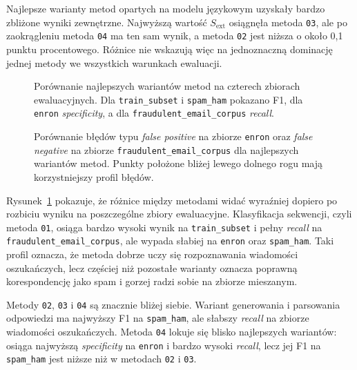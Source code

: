\begin{table}[htbp]
\centering
\small
\resizebox{\textwidth}{!}{}
\caption{Najlepsze punkty kontrolne uzyskane dla porównywanych metod.}
\label{tab:method-comparison-best}
\end{table}

Najlepsze warianty metod opartych na modelu językowym uzyskały bardzo zbliżone
wyniki zewnętrzne. Najwyższą wartość \(S_{\mathrm{ext}}\) osiągnęła metoda
\texttt{03}, ale po zaokrągleniu metoda \texttt{04} ma ten sam wynik, a metoda
\texttt{02} jest niższa o około 0,1 punktu procentowego. Różnice nie wskazują
więc na jednoznaczną dominację jednej metody we wszystkich warunkach ewaluacji.

\begin{figure}[htbp]
\centering

\caption{Porównanie najlepszych wariantów metod na czterech zbiorach
ewaluacyjnych. Dla \texttt{train\_subset} i \texttt{spam\_ham} pokazano F1, dla
\texttt{enron} \emph{specificity}, a dla \texttt{fraudulent\_email\_corpus}
\emph{recall}.}
\label{fig:method-comparison-dataset-metrics}
\end{figure}

\begin{figure}[htbp]
\centering

\caption{Porównanie błędów typu \emph{false positive} na zbiorze \texttt{enron}
oraz \emph{false negative} na zbiorze \texttt{fraudulent\_email\_corpus} dla
najlepszych wariantów metod. Punkty położone bliżej lewego dolnego rogu mają
korzystniejszy profil błędów.}
\label{fig:method-error-tradeoff}
\end{figure}

Rysunek~\ref{fig:method-comparison-dataset-metrics} pokazuje, że różnice między
metodami widać wyraźniej dopiero po rozbiciu wyniku na poszczególne zbiory
ewaluacyjne. Klasyfikacja sekwencji, czyli metoda
\texttt{01}, osiąga bardzo wysoki wynik na \texttt{train\_subset} i pełny
\emph{recall} na \texttt{fraudulent\_email\_corpus}, ale wypada słabiej na
\texttt{enron} oraz \texttt{spam\_ham}. Taki profil oznacza, że metoda dobrze
uczy się rozpoznawania wiadomości oszukańczych, lecz częściej niż pozostałe
warianty oznacza poprawną korespondencję jako spam i gorzej radzi sobie na
zbiorze mieszanym.

Metody \texttt{02}, \texttt{03} i \texttt{04} są znacznie bliżej siebie. Wariant
generowania i parsowania odpowiedzi ma najwyższy F1 na \texttt{spam\_ham}, ale
słabszy \emph{recall} na zbiorze wiadomości oszukańczych. Metoda \texttt{04}
lokuje się blisko najlepszych wariantów: osiąga najwyższą \emph{specificity} na
\texttt{enron} i bardzo wysoki \emph{recall}, lecz jej F1 na
\texttt{spam\_ham} jest niższe niż w metodach \texttt{02} i \texttt{03}.

